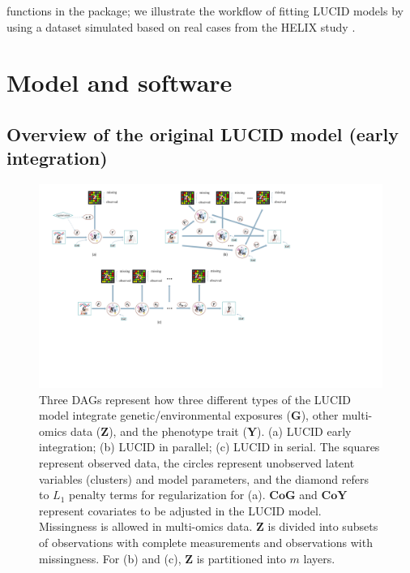 functions in the  package; we illustrate the workflow of fitting LUCID models by using a dataset simulated based on real cases from the HELIX study \citep{vrijheid2014human, maitre2022state}.
\section{Model and software} \label{sec2}
\subsection{Overview of the original LUCID model (early integration)} \label{sec2.1}
\begin{figure}
    \centering
    \includegraphics[scale = 0.31]{figures/fig1.pdf}
    \caption{Three DAGs represent how three different types of the LUCID model integrate genetic/environmental exposures ($\bm G$), other multi-omics data ($\bm Z$), and the phenotype trait ($\bm Y$). (a) LUCID early integration; (b) LUCID in parallel; (c) LUCID in serial. The squares represent observed data, the circles represent unobserved latent variables (clusters) and model parameters, and the diamond refers to $L_1$ penalty terms for regularization for (a). $\bm {CoG}$ and $\bm {CoY}$ represent covariates to be adjusted in the LUCID model. Missingness is allowed in multi-omics data. $\bm Z$ is divided into subsets of observations with complete measurements and observations with missingness. For (b) and (c), $\bm Z$ is partitioned into $m$ layers.}
    \label{fig1}
\end{figure}
